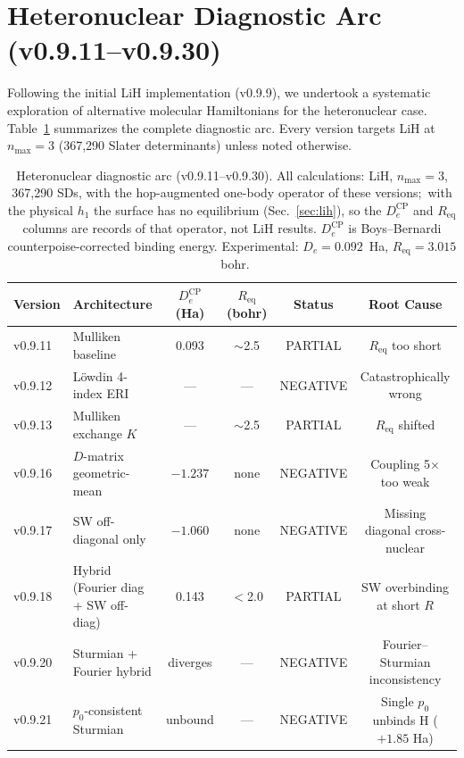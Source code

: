 \documentclass[aps,pra,twocolumn,superscriptaddress,longbibliography,floatfix]{revtex4-2}
\begin{document}
\section{Heteronuclear Diagnostic Arc (v0.9.11--v0.9.30)}
\label{sec:diagnostic_arc}

Following the initial LiH implementation (v0.9.9), we undertook a
systematic exploration of alternative molecular Hamiltonians for the
heteronuclear case.  Table~\ref{tab:diagnostic_arc} summarizes the
complete diagnostic arc.  Every version targets LiH at $n_{\max}=3$
(367{,}290 Slater determinants) unless noted otherwise.

\begin{table}[!htbp]
\centering
\caption{\label{tab:diagnostic_arc}%
Heteronuclear diagnostic arc (v0.9.11--v0.9.30).
All calculations: LiH, $n_{\max}=3$, 367{,}290 SDs, with the hop-augmented
one-body operator of these versions;\ with the physical $h_1$ the surface
has no equilibrium (Sec.~\ref{sec:lih}), so the $D_e^{\text{CP}}$ and
$R_{\text{eq}}$ columns are records of that operator, not LiH results.
$D_e^{\text{CP}}$ is Boys--Bernardi counterpoise-corrected binding energy.
Experimental: $D_e = 0.092$~Ha, $R_{\text{eq}} = 3.015$~bohr.}
\begin{tabular}{llcccc}
\hline
Version & Architecture & $D_e^{\text{CP}}$ (Ha) & $R_{\text{eq}}$ (bohr) & Status & Root Cause \\
\hline
v0.9.11 & Mulliken baseline & 0.093 & $\sim$2.5 & PARTIAL & $R_{\text{eq}}$ too short \\
v0.9.12 & L\"owdin 4-index ERI & --- & --- & NEGATIVE & Catastrophically wrong \\
v0.9.13 & Mulliken exchange $K$ & --- & $\sim$2.5 & PARTIAL & $R_{\text{eq}}$ shifted \\
v0.9.16 & $D$-matrix geometric-mean & $-1.237$ & none & NEGATIVE & Coupling 5$\times$ too weak \\
v0.9.17 & SW off-diagonal only & $-1.060$ & none & NEGATIVE & Missing diagonal cross-nuclear \\
v0.9.18 & Hybrid (Fourier diag + SW off-diag) & 0.143 & $<$2.0 & PARTIAL & SW overbinding at short $R$ \\
v0.9.20 & Sturmian + Fourier hybrid & diverges & --- & NEGATIVE & Fourier--Sturmian inconsistency \\
v0.9.21 & $p_0$-consistent Sturmian & unbound & --- & NEGATIVE & Single $p_0$ unbinds H ($+1.85$ Ha) \\

\end{tabular}
\end{table}
\end{document}
